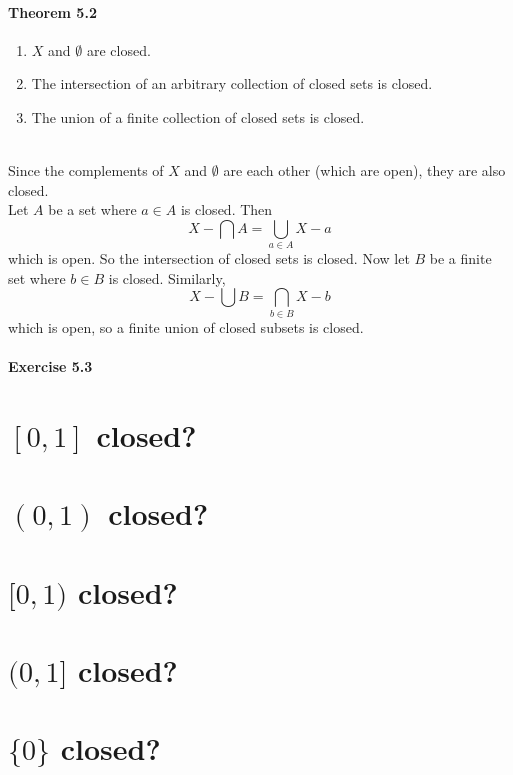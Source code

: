 \subsection{Theorem 5.2}
\setcounter{question}{0}


\begin{enumerate}
 \item $X$ and $\emptyset$ are closed. \\
 \item The intersection of an arbitrary collection of closed sets is closed. \\
 \item The union of a finite collection of closed sets is closed. \\
\end{enumerate}

\begin{solution}
 \\Since the complements of $X$ and $\emptyset$ are each other (which are open), they are also closed. \\
 Let $A$ be a set where $a \in A$ is closed. Then
 $$X - \bigcap A = \bigcup_{a \in A} X-a$$
 which is open. So the intersection of closed sets is closed. Now let $B$ be a finite set where $b \in B$ is closed. Similarly,
 $$X - \bigcup B = \bigcap_{b \in B} X-b$$
 which is open, so a finite union of closed subsets is closed.
\end{solution}

\subsection{Exercise 5.3}
\setcounter{question}{0}


\begin{parts}
 \part{$[0,1]$ closed?}
 \part{$(0,1)$ closed?}
 \part{$[0,1)$ closed?}
 \part{$(0,1]$ closed?}
 \part{$\{0\}$ closed?}
\end{parts}

